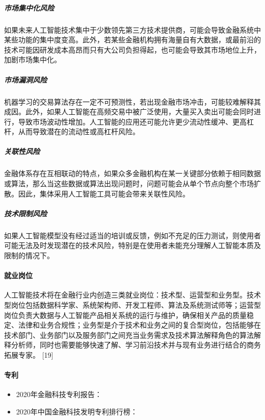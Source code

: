 \documentclass[letterpaper,10pt,english]{sphinxmanual}
\begin{document}
\subparagraph{市场集中化风险}
\label{\detokenize{chapter_project/AI_Finance:id22}}
如果未来人工智能技术集中于少数领先第三方技术提供商，可能会导致金融系统中某些功能的集中度变高。此外，若某些金融机构拥有海量自有大数据，或最前沿的技术可能因研发成本高昂而只有大公司负担得起，也可能会导致其市场地位上升，加剧市场集中化。


\subparagraph{市场漏洞风险}
\label{\detokenize{chapter_project/AI_Finance:id23}}
机器学习的交易算法存在一定不可预测性，若出现金融市场冲击，可能较难解释其成因。此外，如果人工智能在高频交易中被广泛使用，大量买入卖出可能会同时进行，导致市场波动性增加。人工智能的应用还可能允许更少流动性缓冲、更高杠杆，从而导致潜在的流动性或高杠杆风险。


\subparagraph{关联性风险}
\label{\detokenize{chapter_project/AI_Finance:id24}}
金融体系存在互相联动的特点，如果众多金融机构在某一关键部分依赖于相同数据或算法，那么当这些数据或算法出现问题时，问题可能会从单个节点向整个市场扩散。因此，集体采用人工智能工具可能会带来关联性风险。


\subparagraph{技术限制风险}
\label{\detokenize{chapter_project/AI_Finance:id25}}
如果人工智能模型没有经过适当的培训或反馈，例如不充足的压力测试，则使用者可能无法及时发现潜在的技术风险，特别是在使用者未能充分理解人工智能本质及限制的情况下。


\paragraph{就业岗位}
\label{\detokenize{chapter_project/AI_Finance:id26}}
人工智能技术将在金融行业内创造三类就业岗位：技术型、运营型和业务型。技术型岗位包括数据科学家、系统架构师、开发工程师、算法及系统测试师等；运营型岗位负责大数据与人工智能产品相关系统的运行与维护，确保相关产品的质量稳定、法律和业务合规性；业务型是介于技术和业务之间的复合型岗位，包括能够在技术部门、业务部门以及服务部门之间充当业务需求及技术算法解释角色的算法解释分析师，同时也需要能够快速了解、学习前沿技术并与现有业务进行结合的商务拓展专家。
{[}19{]}


\paragraph{专利}
\label{\detokenize{chapter_project/AI_Finance:id27}}\begin{itemize}
\item {} 
2020年金融科技专利报告：

\item {} 
2020年中国金融科技发明专利排行榜：

\end{itemize}
\end{document}
